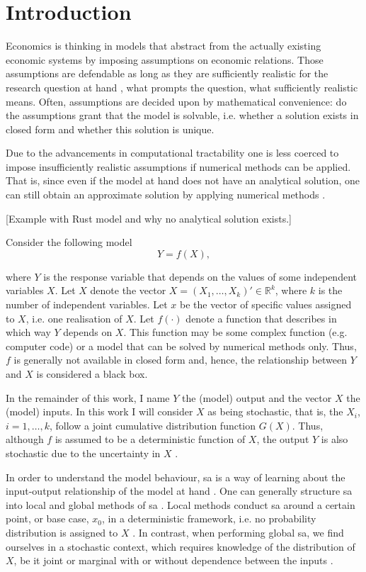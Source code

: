 \section{Introduction} \label{intro}

Economics is thinking in models that abstract from the actually existing economic systems by imposing assumptions on economic relations. Those assumptions are defendable as long as they are sufficiently realistic for the research question at hand \citep{F66}, what prompts the question, what sufficiently realistic means. Often, assumptions are decided upon by mathematical convenience: do the assumptions grant that the model is solvable, i.e. whether a solution exists in closed form and whether this solution is unique.

Due to the advancements in computational tractability one is less coerced to impose insufficiently realistic assumptions if numerical methods can be applied. That is, since even if the model at hand does not have an analytical solution, one can still obtain an approximate solution by applying numerical methods \citep{MF04}.

[Example with Rust model and why no analytical solution exists.]

\noindent Consider the following model
\begin{equation*}
Y = f(X),
\end{equation*}

where $Y$ is the response variable that depends on the values of some independent variables $X$. Let $X$ denote the vector $X = (X_1, \dots, X_k)' \in \mathbb{R}^k$, where $k$ is the number of independent variables. Let $x$ be the vector of specific values assigned to $X$, i.e. one realisation of $X$. Let $f(\cdot)$ denote a function that describes in which way $Y$ depends on $X$. This function may be some complex function (e.g. computer code) or a model that can be solved by numerical methods only. Thus, $f$ is generally not available in closed form and, hence, the relationship between $Y$ and $X$ is considered a black box.

In the remainder of this work, I name $Y$ the (model) output and the vector $X$ the (model) inputs. In this work I will consider $X$ as being stochastic, that is, the $X_i$, $i = 1,\dots, k$, follow a joint cumulative distribution function $G(X)$. Thus, although $f$ is assumed to be a deterministic function of $X$, the output $Y$ is also stochastic due to the uncertainty in $X$ \citep{SNS16}.

In order to understand the model behaviour, sa is a way of learning about the input-output relationship of the model at hand \citep{BP16}. One can generally structure sa into local and global methods of sa \citep{BP16}. Local methods conduct sa around a certain point, or base case, $x_0$, in a deterministic framework, i.e. no probability distribution is assigned to $X$ \citep{BP16}. In contrast, when performing global sa, we find ourselves in a stochastic context, which requires knowledge of the distribution of $X$, be it joint or marginal with or without dependence between the inputs \citep{ST02}.

